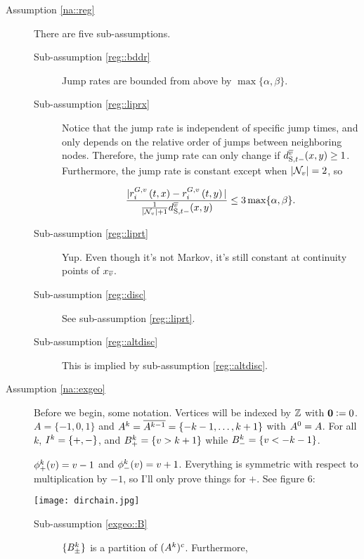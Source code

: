 \begin{description}
\item[Assumption \ref{na::reg}] There are five sub-assumptions.

\begin{description}
\item[Sub-assumption \ref{reg::bddr}] Jump rates are bounded from above by \(\max\{\alpha,\beta\}\).

\item[Sub-assumption \ref{reg::liprx}]

Notice that the jump rate is independent of specific jump times, and only depends on the relative order of jumps between neighboring nodes. Therefore, the jump rate can only change if \(\stmet{t-}^{\cl{v}}(\xf,\xg) \geq 1\). Furthermore, the jump rate is constant except when \(|\mathcal{N}_{v}| = 2\), so 

\[\frac{|\rate\gvpara{G}{v}\stpara{i}\tmepro{t}{\xf}{} - \rate\gvpara{G}{v}\stpara{i}\tmepro{t}{\xg}{}|}{\frac{1}{|\neigh{v}|+1}\stmet{t-}^{\cl{v}}(\xf,\xg)}\leq 3\max\{\alpha,\beta\}.\]

\item[Sub-assumption \ref{reg::liprt}] Yup. Even though it's not Markov, it's still constant at continuity points of \(x_{\overline{v}}\).

\item[Sub-assumption \ref{reg::disc}] See sub-assumption \ref{reg::liprt}.

\item[Sub-assumption \ref{reg::altdisc}] This is implied by sub-assumption \ref{reg::altdisc}.
\end{description}

\item[Assumption \ref{na::exgeo}] Before we begin, some notation. Vertices will be indexed by \(\mathbb{Z}\) with \(\mathbf{0} := 0\). \(A = \{-1,0,1\}\) and \(A^{k} = \overline{A^{k-1}} = \{-k-1,\dots,k+1\}\) with \(A^{0} = A\). For all \(k\), \(I^{k} = \{+,-\}\), and \(B^{k}_+ = \{v > k+1\}\) while \(B^{k}_- = \{v < -k-1\}\).

\ind \(\phi^{k}_+(v) = v-1\) and \(\phi^{k}_-(v) = v+1\). Everything is symmetric with respect to multiplication by \(-1\), so I'll only prove things for \(+\). See figure 6:

\texttt{[image: dirchain.jpg]}

\begin{description}
\item[Sub-assumption \ref{exgeo::B}] \(\{B^{k}_{\pm}\}\) is a partition of \((A^{k})^c\). Furthermore,


\end{description}
\end{description}
